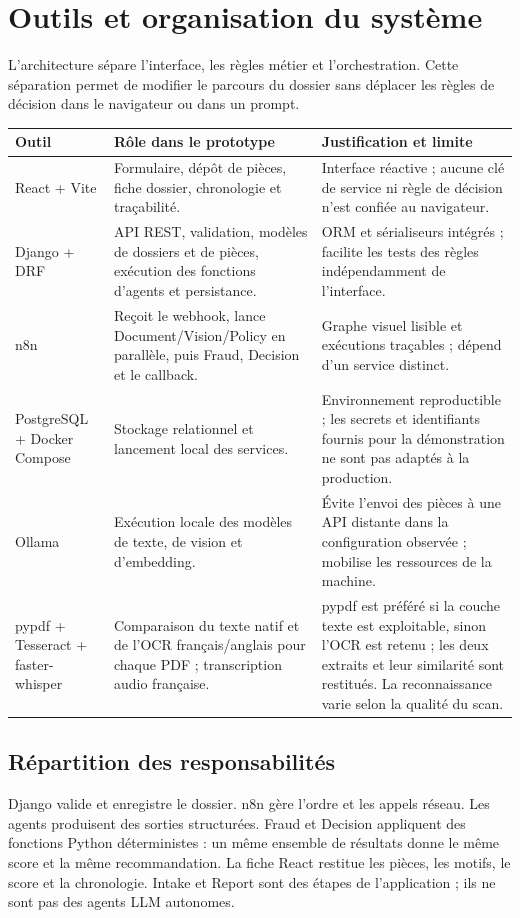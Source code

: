 \documentclass[10pt,a4paper]{article}
\newcommand{\tighttable}{\small\renewcommand{\arraystretch}{1.14}}
\newcommand{\strong}[1]{\textbf{#1}}
\begin{document}
\tableofcontents
\clearpage
{}
\setcounter{page}{1}

\section{Outils et organisation du système}
L’architecture sépare l’interface, les règles métier et l’orchestration. Cette séparation permet de modifier le parcours du dossier sans déplacer les règles de décision dans le navigateur ou dans un prompt.

\tighttable
\begin{tabularx}{\textwidth}{@{}p{2.6cm}p{4.0cm}X@{}}
\toprule
\strong{Outil} & \strong{Rôle dans le prototype} & \strong{Justification et limite}\\
\midrule
React + Vite & Formulaire, dépôt de pièces, fiche dossier, chronologie et traçabilité. & Interface réactive ; aucune clé de service ni règle de décision n’est confiée au navigateur.\\
Django + DRF & API REST, validation, modèles de dossiers et de pièces, exécution des fonctions d’agents et persistance. & ORM et sérialiseurs intégrés ; facilite les tests des règles indépendamment de l’interface.\\
n8n & Reçoit le webhook, lance Document/Vision/Policy en parallèle, puis Fraud, Decision et le callback. & Graphe visuel lisible et exécutions traçables ; dépend d’un service distinct.\\
PostgreSQL + Docker Compose & Stockage relationnel et lancement local des services. & Environnement reproductible ; les secrets et identifiants fournis pour la démonstration ne sont pas adaptés à la production.\\
Ollama & Exécution locale des modèles de texte, de vision et d’embedding. & Évite l’envoi des pièces à une API distante dans la configuration observée ; mobilise les ressources de la machine.\\
pypdf + Tesseract + faster-whisper & Comparaison du texte natif et de l’OCR français/anglais pour chaque PDF ; transcription audio française. & pypdf est préféré si la couche texte est exploitable, sinon l’OCR est retenu ; les deux extraits et leur similarité sont restitués. La reconnaissance varie selon la qualité du scan.\\
\bottomrule
\end{tabularx}
\normalsize

\subsection*{Répartition des responsabilités}
Django valide et enregistre le dossier. n8n gère l’ordre et les appels réseau. Les agents produisent des sorties structurées. Fraud et Decision appliquent des fonctions Python déterministes : un même ensemble de résultats donne le même score et la même recommandation. La fiche React restitue les pièces, les motifs, le score et la chronologie. Intake et Report sont des étapes de l’application ; ils ne sont pas des agents LLM autonomes.
\end{document}

